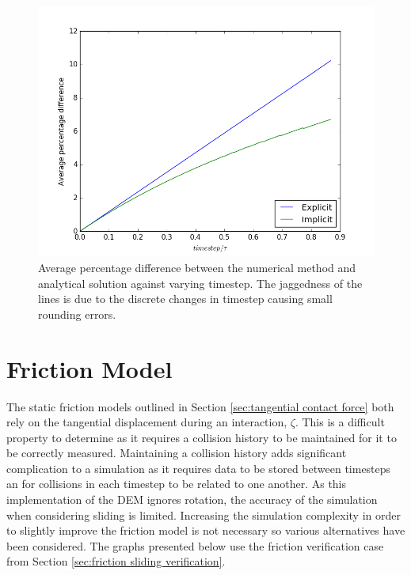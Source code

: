 \documentclass[10pt,a4paper,titlepage]{report}
\begin{document}
\begin{figure}[!htb]
\centering
\includegraphics[scale=0.6]{figures/AveragePercentageDifferenceAgainstTimestep.png}
\caption{Average percentage difference between the numerical method and analytical solution against varying timestep. The jaggedness of the lines is due to the discrete changes in timestep causing small rounding errors.}
\label{fig:avg_percent_diff_against_timestep}
\end{figure}
\section{Friction Model}
\label{sec:friction model}
The static friction models outlined in Section \ref{sec:tangential contact force} both rely on the tangential displacement during an interaction, $\zeta$. This is a difficult property to determine as it requires a collision history to be maintained for it to be correctly measured. Maintaining a collision history adds significant complication to a simulation as it requires data to be stored between timesteps an for collisions in each timestep to be related to one another. As this implementation of the DEM ignores rotation, the accuracy of the simulation when considering sliding is limited. Increasing the simulation complexity in order to slightly improve the friction model is not necessary so various alternatives have been considered. The graphs presented below use the friction verification case from Section \ref{sec:friction sliding verification}.
\end{document}
